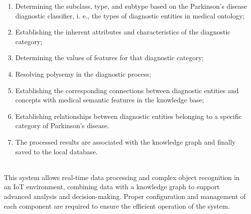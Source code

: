 \documentclass[10pt,two column]{article}
\begin{document}
\begin{SCn}
\begin{enumerate}[label=\arabic*)]
    \item Determining the subclass, type, and subtype based on the Parkinson’s disease diagnostic classifier, i. e., the types of diagnostic entities in medical ontology;
    \item Establishing the inherent attributes and characteristics of the diagnostic category;
    \item Determining the values of features for that diagnostic category;
    \item Resolving polysemy in the diagnostic process;
    \item Establishing the corresponding connections between diagnostic entities and concepts with medical semantic features in the knowledge base;
    \item Establishing relationships between diagnostic entities belonging to a specific category of Parkinson’s disease.
    \item The processed results are associated with the knowledge graph and finally saved to the local database. 
\end{enumerate} \\
This system allows real-time data processing and complex object recognition in an IoT environment, combining data with a knowledge graph to support advanced
analysis and decision-making. Proper configuration and
management of each component are required to ensure
the efficient operation of the system.

\end{SCn}
\end{document}
